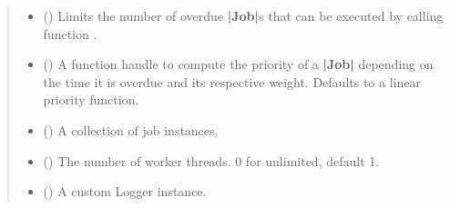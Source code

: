 \documentclass[letterpaper,10pt,english]{sphinxmanual}
\begin{document}
\begin{fulllineitems}
\begin{quote}
\begin{description}
\begin{itemize}
\item {} 
\sphinxAtStartPar
{} () \textendash{} Limits the number of overdue {\color{red}\bfseries{}|Job|}s that can be executed
by calling function .

\item {} 
\sphinxAtStartPar
{} (\sphinxstyleliteralemphasis{\sphinxupquote{{[}}}\sphinxstyleliteralemphasis{\sphinxupquote{{[}}}\sphinxstyleliteralemphasis{\sphinxupquote{, }}\sphinxstyleliteralemphasis{\sphinxupquote{, }}\sphinxstyleliteralemphasis{\sphinxupquote{, }}\sphinxstyleliteralemphasis{\sphinxupquote{{]}}}\sphinxstyleliteralemphasis{\sphinxupquote{, }}\sphinxstyleliteralemphasis{\sphinxupquote{{]}}}) \textendash{} A function handle to compute the priority of a {\color{red}\bfseries{}|Job|} depending
on the time it is overdue and its respective weight. Defaults to a linear
priority function.

\item {} 
\sphinxAtStartPar
{} (\sphinxstyleliteralemphasis{\sphinxupquote{{[}}}\sphinxstyleliteralemphasis{\sphinxupquote{{]}}}) \textendash{} A collection of job instances.

\item {} 
\sphinxAtStartPar
{} () \textendash{} The number of worker threads. 0 for unlimited, default 1.

\item {} 
\sphinxAtStartPar
{} (\sphinxstyleliteralemphasis{\sphinxupquote{{[}}}\sphinxstyleliteralemphasis{\sphinxupquote{{]}}}) \textendash{} A custom Logger instance.

\end{itemize}


\end{description}
\end{quote}
\end{fulllineitems}
\end{document}
